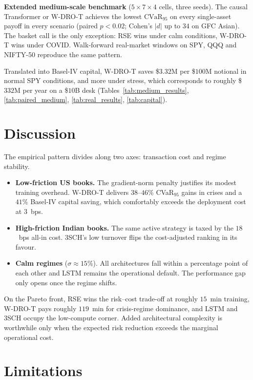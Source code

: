 \documentclass[11pt,oneside]{report}
\newcommand{\cvar}{\mathrm{CVaR}}
\begin{document}
\textbf{Extended medium-scale benchmark} ($5{\times}7{\times}4$ cells, three seeds). The causal Transformer or W-DRO-T achieves the lowest $\cvar_{95}$ on every single-asset payoff in every scenario (paired $p < 0.02$; Cohen's $|d|$ up to $34$ on GFC Asian). The basket call is the only exception: RSE wins under calm conditions, W-DRO-T wins under COVID. Walk-forward real-market windows on SPY, QQQ and NIFTY-50 reproduce the same pattern.

Translated into Basel-IV capital, W-DRO-T saves \$$3.32$M per \$$100$M notional in normal SPY conditions, and more under stress, which corresponds to roughly \$$332$M per year on a \$$10$B desk (Tables~\ref{tab:medium_results}, \ref{tab:paired_medium}, \ref{tab:real_results}, \ref{tab:capital}).


\section{Discussion}
\label{sec:concl_discussion}

The empirical pattern divides along two axes: transaction cost and regime stability.

\begin{itemize}
  \item \textbf{Low-friction US books.} The gradient-norm penalty justifies its modest training overhead. W-DRO-T delivers $38$--$46\%$ CVaR$_{95}$ gains in crises and a $41\%$ Basel-IV capital saving, which comfortably exceeds the deployment cost at $3$~bps.
  \item \textbf{High-friction Indian books.} The same active strategy is taxed by the $18$~bps all-in cost. 3SCH's low turnover flips the cost-adjusted ranking in its favour.
  \item \textbf{Calm regimes} ($\sigma \approx 15\%$). All architectures fall within a percentage point of each other and LSTM remains the operational default. The performance gap only opens once the regime shifts.
\end{itemize}

On the Pareto front, RSE wins the risk--cost trade-off at roughly $15$~min training, W-DRO-T pays roughly $119$~min for crisis-regime dominance, and LSTM and 3SCH occupy the low-compute corner. Added architectural complexity is worthwhile only when the expected risk reduction exceeds the marginal operational cost.


\section{Limitations}
\label{sec:limitations}
\end{document}
